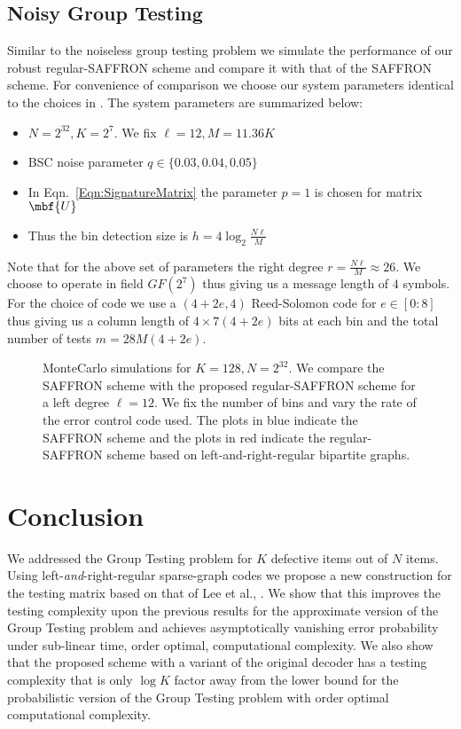 \documentclass[conference,twocolumn]{IEEEtran}
\newcommand*{\MyPath}{../bib}
\newcommand*{\FigPath}{./Figures}
\begin{document}
\subsection*{Noisy Group Testing}
Similar to the noiseless group testing problem we simulate the performance of our robust regular-SAFFRON scheme and compare it with that of the SAFFRON scheme. For convenience of comparison we choose our system parameters identical to the choices in \cite{lee2015saffron}. The system parameters are summarized below:
\begin{itemize}
\item $N=2^{32}, K=2^7$. We fix $\ell=12, M=11.36K$ 
\item BSC noise parameter $q\in\{0.03,0.04,0.05\}$
\item In Eqn.~\ref{Eqn:SignatureMatrix} the parameter $p=1$ is chosen for matrix $\mbf{U}$
\item Thus the bin detection size is $h=4\log_2 \frac{N\ell}{M}$
\end{itemize}
Note that for the above set of parameters the right degree $r=\frac{N\ell}{M}\approx 26$. We choose to operate in field $GF(2^7)$ thus giving us a message length of $4$ symbols. For the choice of code we use a $(4+2e,4)$ Reed-Solomon code for $e\in[0:8]$ thus giving us a column length of $4\times 7(4+2e)$ bits at each bin and the total number of tests $m=28M(4+2e)$.

\begin{figure}[t!]
\centering

\caption{MonteCarlo simulations for $K=128, N=2^{32}$. We compare the SAFFRON scheme with the proposed regular-SAFFRON scheme for a left degree $\ell=12$. We fix the number of bins and vary the rate of the error control code used. The plots in blue indicate the SAFFRON scheme\cite{lee2015saffron} and the plots in red indicate the regular-SAFFRON scheme based on left-and-right-regular bipartite graphs.}
\label{Fig:SimulationNoisy}
\end{figure}

\section{Conclusion}
We addressed the Group Testing problem for $K$ defective items out of $N$ items. Using left-\emph{and}-right-regular sparse-graph codes we propose a new construction for the testing matrix based on that of Lee et al., \cite{lee2015saffron}. We show that this improves the testing complexity upon the previous results for the approximate version of the Group Testing problem and achieves asymptotically vanishing error probability under sub-linear time, order optimal, computational complexity. We also show that the proposed scheme with a variant of the original decoder has a testing complexity that is only $\log K$ factor away from the lower bound for the probabilistic version of the Group Testing problem with order optimal computational complexity.



\end{document}
